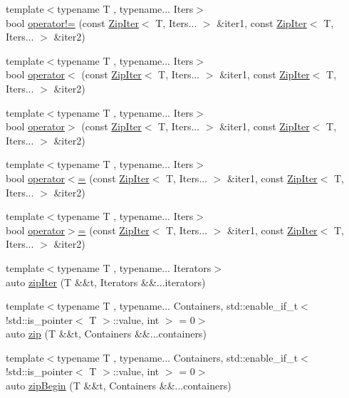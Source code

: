 \begin{DoxyCompactItemize}
{\footnotesize template$<$typename T , typename... Iters$>$ }\\bool \hyperlink{namespaceit_aa1ec126ca216c4ff8b511f7b2f1d1e68}{operator!=} (const \hyperlink{classit_1_1ZipIter}{Zip\+Iter}$<$ T, Iters... $>$ \&iter1, const \hyperlink{classit_1_1ZipIter}{Zip\+Iter}$<$ T, Iters... $>$ \&iter2)
\item 
{\footnotesize template$<$typename T , typename... Iters$>$ }\\bool \hyperlink{namespaceit_a9667a596ccc9f03510373b78b8048512}{operator$<$} (const \hyperlink{classit_1_1ZipIter}{Zip\+Iter}$<$ T, Iters... $>$ \&iter1, const \hyperlink{classit_1_1ZipIter}{Zip\+Iter}$<$ T, Iters... $>$ \&iter2)
\item 
{\footnotesize template$<$typename T , typename... Iters$>$ }\\bool \hyperlink{namespaceit_ae28db9a014731d151257e863f3d5a1d1}{operator$>$} (const \hyperlink{classit_1_1ZipIter}{Zip\+Iter}$<$ T, Iters... $>$ \&iter1, const \hyperlink{classit_1_1ZipIter}{Zip\+Iter}$<$ T, Iters... $>$ \&iter2)
\item 
{\footnotesize template$<$typename T , typename... Iters$>$ }\\bool \hyperlink{namespaceit_a9e84d394dd1fe80b87302e9a0e292028}{operator$<$=} (const \hyperlink{classit_1_1ZipIter}{Zip\+Iter}$<$ T, Iters... $>$ \&iter1, const \hyperlink{classit_1_1ZipIter}{Zip\+Iter}$<$ T, Iters... $>$ \&iter2)
\item 
{\footnotesize template$<$typename T , typename... Iters$>$ }\\bool \hyperlink{namespaceit_a31f1d6d5066e50a2d93fac8597c53b1f}{operator$>$=} (const \hyperlink{classit_1_1ZipIter}{Zip\+Iter}$<$ T, Iters... $>$ \&iter1, const \hyperlink{classit_1_1ZipIter}{Zip\+Iter}$<$ T, Iters... $>$ \&iter2)
\item 
{\footnotesize template$<$typename T , typename... Iterators$>$ }\\auto \hyperlink{namespaceit_ac53929012901097d70c031455ed71c3b}{zip\+Iter} (T \&\&t, Iterators \&\&...iterators)
\item 
{\footnotesize template$<$typename T , typename... Containers, std\+::enable\+\_\+if\+\_\+t$<$ !std\+::is\+\_\+pointer$<$ T $>$\+::value, int $>$  = 0$>$ }\\auto \hyperlink{namespaceit_af56a1ed82f73fa9bf680152e3618eb7e}{zip} (T \&\&t, Containers \&\&...containers)
\item 
{\footnotesize template$<$typename T , typename... Containers, std\+::enable\+\_\+if\+\_\+t$<$ !std\+::is\+\_\+pointer$<$ T $>$\+::value, int $>$  = 0$>$ }\\auto \hyperlink{namespaceit_ada609562dc2444e6d70e548cb1ea76c4}{zip\+Begin} (T \&\&t, Containers \&\&...containers)

\end{DoxyCompactItemize}
